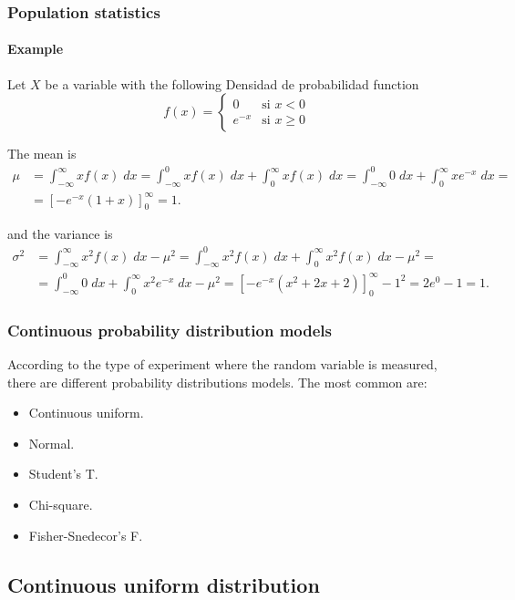 \begin{frame}
\frametitle{Population statistics}
\framesubtitle{Example}
Let $X$ be a variable with the following Densidad de probabilidad function
\[
f(x) =
\begin{cases}
0 & \mbox{si $x<0$}\\
e^{-x} & \mbox{si $x\geq 0$}
\end{cases}
\]

The mean is 
\begin{align*}
\mu &= \int_{-\infty}^\infty xf(x)\;dx = \int_{-\infty}^0 xf(x)\;dx +\int_0^\infty xf(x)\;dx = \int_{-\infty}^0 0\;dx +\int_0^\infty xe^{-x}\;dx =\\
&= \left[-e^{-x}(1+x)\right]_0^{\infty} = 1.
\end{align*}

and the variance is
\begin{align*}
\sigma^2 &= \int_{-\infty}^\infty x^2f(x)\;dx -\mu^2 = \int_{-\infty}^0 x^2f(x)\;dx +\int_0^\infty x^2f(x)\;dx -\mu^2 = \\
&= \int_{-\infty}^0 0\;dx +\int_0^\infty x^2e^{-x}\;dx -\mu^2= \left[-e^{-x}(x^2+2x+2)\right]_0^{\infty} - 1^2= 2e^0-1 = 1.
\end{align*}

\end{frame}



\begin{frame}
\frametitle{Continuous probability distribution models}
According to the type of experiment where the random variable is measured, there are different probability distributions models. 
The most common are:
\begin{itemize}
\item Continuous uniform.
\item Normal.
\item Student's T.
\item Chi-square.
\item Fisher-Snedecor's F.
\end{itemize}
\end{frame}


\subsection{Continuous uniform distribution}

